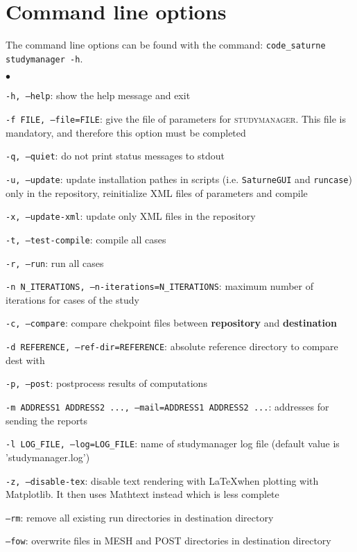 \documentclass[a4paper,10pt,twoside]{csshortdoc}
\begin{document}
\section{Command line options}

The command line options can be found with the command: \texttt{code\_saturne
studymanager -h}.

\begin{list}{$\bullet$}{}
\item \texttt{-h, --help}: show the help message and exit
\item \texttt{-f FILE, --file=FILE}: give the file of parameters for
\textsc{studymanager}. This file is mandatory, and therefore this option must be
completed
\item \texttt{-q, --quiet}: do not print status messages to stdout
\item \texttt{-u, --update}: update installation pathes in scripts (i.e. \texttt{SaturneGUI} and
  \texttt{runcase}) only in the repository, reinitialize XML files of parameters and compile
\item \texttt{-x, --update-xml}: update only XML files in the repository
\item \texttt{-t, --test-compile}: compile all cases
\item \texttt{-r, --run}: run all cases
\item \texttt{-n N\_ITERATIONS, --n-iterations=N\_ITERATIONS}: maximum number of iterations for cases of the study
\item \texttt{-c, --compare}: compare chekpoint files between \textbf{repository} and \textbf{destination}
\item \texttt{-d REFERENCE, --ref-dir=REFERENCE}: absolute reference directory to compare dest with
\item \texttt{-p, --post}: postprocess results of computations
\item \texttt{-m ADDRESS1 ADDRESS2 ..., --mail=ADDRESS1 ADDRESS2 ...}: addresses for sending the reports
\item \texttt{-l LOG\_FILE, --log=LOG\_FILE}: name of studymanager log file (default value is 'studymanager.log')
\item \texttt{-z, --disable-tex}: disable text rendering with \LaTeX when plotting with Matplotlib. It then uses Mathtext instead which is less complete
\item \texttt{--rm}: remove all existing run directories in destination directory
\item \texttt{--fow}: overwrite files in MESH and POST directories in destination directory

\end{list}
\end{document}
